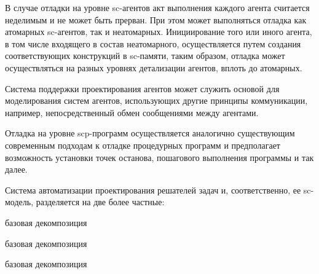 В случае отладки на уровне sc-агентов акт выполнения каждого агента считается неделимым и не может быть прерван. При этом может выполняться отладка как атомарных sc-агентов, так и неатомарных. Инициирование того или иного агента, в том числе входящего в состав неатомарного, осуществляется путем создания соответствующих конструкций в sc-памяти, таким образом, отладка может осуществляться на разных уровнях детализации агентов, вплоть до атомарных.

Система поддержки проектирования агентов может служить основой для моделирования систем агентов, использующих другие принципы коммуникации, например, непосредственный обмен сообщениями между агентами.

Отладка на уровне scp-программ осуществляется аналогично существующим современным подходам к отладке процедурных программ и предполагает возможность установки точек останова, пошагового выполнения программы и так далее.

Система автоматизации проектирования решателей задач и, соответственно, ее sc-модель, разделяется на две более частные:

\begin{SCn}
\begin{scnrelfromset}{базовая декомпозиция}
\begin{scnindent}
    \begin{scnrelfromset}{базовая декомпозиция}
    \end{scnrelfromset}
\end{scnindent}
\begin{scnindent}
    \begin{scnrelfromset}{базовая декомпозиция}
    \end{scnrelfromset}
\end{scnindent}
\end{scnrelfromset}
\end{SCn}

